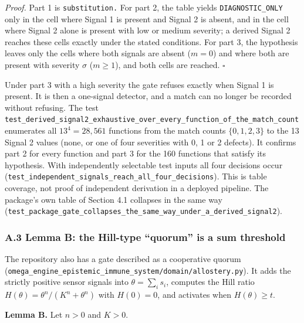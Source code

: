 \documentclass[
  11pt,
]{article}
\begin{document}
\emph{Proof.} Part 1 is \nolinkurl{substitution.} For part 2, the table
yields \nolinkurl{DIAGNOSTIC_ONLY} only in the cell where Signal 1 is
present and Signal 2 is absent, and in the cell where Signal 2 alone is
present with low or medium severity; a derived Signal 2 reaches these
cells exactly under the stated conditions. For part 3, the hypothesis
leaves only the cells where both signals are absent (\(m = 0\)) and
where both are present with severity \(\sigma\) (\(m \geq 1\)), and both
cells are reached. \(\square\)

Under part 3 with a high severity the gate refuses exactly when Signal 1
is present. It is then a one-signal detector, and a match can no longer
be recorded without refusing. The test
\nolinkurl{test_derived_signal2_exhaustive_over_every_function_of_the_match_count}
enumerates all \(13^4 = 28{,\allowbreak }561\) functions from the match
counts \(\{0,\allowbreak  1,\allowbreak  2,\allowbreak  3\}\) to the 13
Signal 2 values (none, or one of four severities with 0, 1 or 2
defects). It confirms part 2 for every function and part 3 for the 160
functions that satisfy its hypothesis. With independently selectable
test inputs all four decisions occur
(\nolinkurl{test_independent_signals_reach_all_four_decisions}). This is
table coverage, not proof of independent derivation in a deployed
pipeline. The package's own table of Section 4.1 collapses in the same
way
(\nolinkurl{test_package_gate_collapses_the_same_way_under_a_derived_signal2}).

\subsubsection{A.3 Lemma B: the Hill-type ``quorum'' is a sum
threshold}\label{a.3-lemma-b-the-hill-type-quorum-is-a-sum-threshold}

The repository also has a gate described as a cooperative quorum
(\nolinkurl{omega_engine_epistemic_immune_system/domain/allostery.py}).
It adds the strictly positive sensor signals into
\(\theta = \sum_i s_i\), computes the Hill ratio
\(H(\theta) = \theta^n / (K^n + \theta^n)\) with \(H(0) = 0\), and
activates when \(H(\theta) \geq t\).

\textbf{Lemma B.} Let \(n > 0\) and \(K > 0\).
\end{document}
